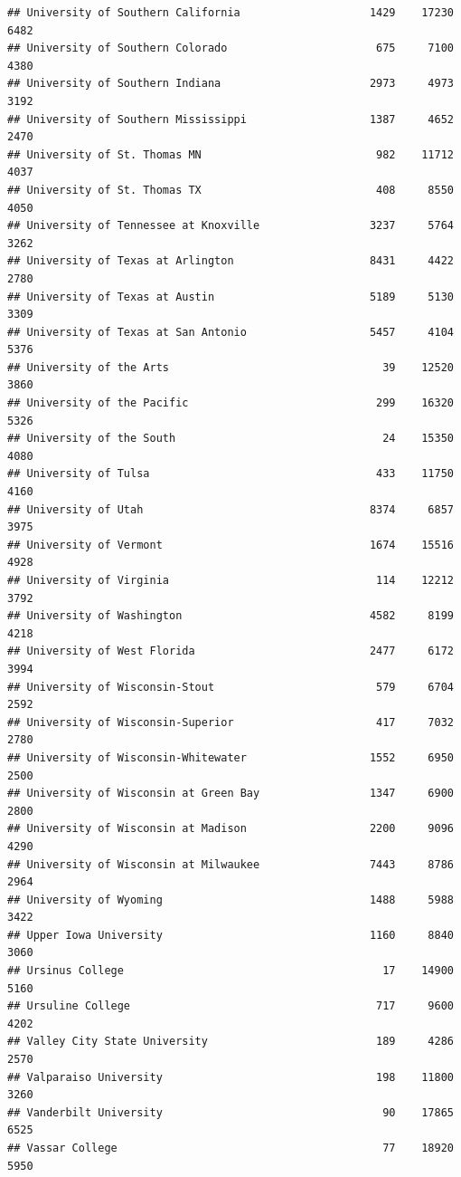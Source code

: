 \documentclass[
]{article}
\begin{document}
\begin{verbatim}
## University of Southern California                    1429    17230       6482
## University of Southern Colorado                       675     7100       4380
## University of Southern Indiana                       2973     4973       3192
## University of Southern Mississippi                   1387     4652       2470
## University of St. Thomas MN                           982    11712       4037
## University of St. Thomas TX                           408     8550       4050
## University of Tennessee at Knoxville                 3237     5764       3262
## University of Texas at Arlington                     8431     4422       2780
## University of Texas at Austin                        5189     5130       3309
## University of Texas at San Antonio                   5457     4104       5376
## University of the Arts                                 39    12520       3860
## University of the Pacific                             299    16320       5326
## University of the South                                24    15350       4080
## University of Tulsa                                   433    11750       4160
## University of Utah                                   8374     6857       3975
## University of Vermont                                1674    15516       4928
## University of Virginia                                114    12212       3792
## University of Washington                             4582     8199       4218
## University of West Florida                           2477     6172       3994
## University of Wisconsin-Stout                         579     6704       2592
## University of Wisconsin-Superior                      417     7032       2780
## University of Wisconsin-Whitewater                   1552     6950       2500
## University of Wisconsin at Green Bay                 1347     6900       2800
## University of Wisconsin at Madison                   2200     9096       4290
## University of Wisconsin at Milwaukee                 7443     8786       2964
## University of Wyoming                                1488     5988       3422
## Upper Iowa University                                1160     8840       3060
## Ursinus College                                        17    14900       5160
## Ursuline College                                      717     9600       4202
## Valley City State University                          189     4286       2570
## Valparaiso University                                 198    11800       3260
## Vanderbilt University                                  90    17865       6525
## Vassar College                                         77    18920       5950

\end{verbatim}
\end{document}
